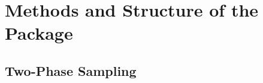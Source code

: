 \documentclass[article]{jss}
\begin{document}
%




\section{Methods and Structure of the Package}
\label{sec:str_and_mod}



\subsection{Two-Phase Sampling}
\end{document}

